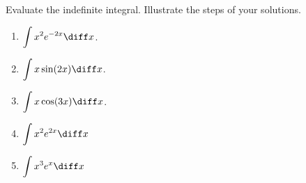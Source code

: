 Evaluate the indefinite integral. Illustrate the steps of your solutions.
\begin{multicols}{2}
\begin{enumerate}[ref={\fcProblemRef}]
\item \label{problemintx^2e^(-2x)dx} $\displaystyle \int x^2 e^{-2x}\diff x$.
\item $\displaystyle \int x \sin (2x)\diff x$.
\item $\displaystyle \int x \cos (3x)\diff x$.
\item $\displaystyle \int x^2 e^{2x}\diff x$
\item $\displaystyle \int x^3 e^x \diff x$
\end{enumerate}
\end{multicols}